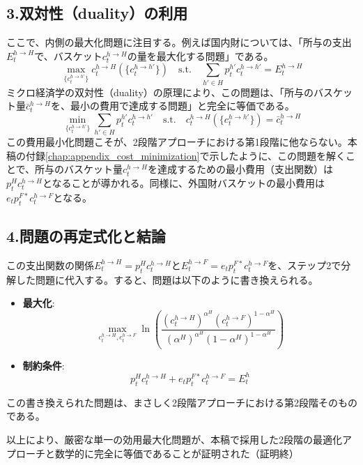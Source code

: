 \subsection*{3.双対性（duality）の利用}
\label{sec:appendix_equivalence_sub3}
ここで、内側の最大化問題に注目する。例えば国内財については、「所与の支出\(E_t^{h\to H}\)で、バスケット\(c_t^{h\to H}\)の量を最大化する問題」である。
\begin{equation}
\max_{\{c_t^{h\to h'}\}}c_t^{h\to H}(\{c_t^{h\to h'}\})\quad\text{s.t.}\quad\sum_{h'\in H}p_t^{h'}c_t^{h\to h'}=E_t^{h\to H}
\label{eq:appendix_equivalence_sub3_duality_max}
\end{equation}
ミクロ経済学の双対性（duality）の原理により、この問題は、「所与のバスケット量\(\bar{c}_t^{h\to H}\)を、最小の費用で達成する問題」と完全に等価である。
\begin{equation}
\min_{\{c_t^{h\to h'}\}}\sum_{h'\in H}p_t^{h'}c_t^{h\to h'}\quad\text{s.t.}\quad c_t^{h\to H}(\{c_t^{h\to h'}\})=\bar{c}_t^{h\to H}
\label{eq:appendix_equivalence_sub3_duality_min}
\end{equation}
この費用最小化問題こそが、2段階アプローチにおける第1段階に他ならない。本稿の付録\ref{chap:appendix_cost_minimization}で示したように、この問題を解くことで、所与のバスケット量\(c_t^{h\to H}\)を達成するための最小費用（支出関数）は\(p_t^Hc_t^{h\to H}\)となることが導かれる。同様に、外国財バスケットの最小費用は\(e_tp_t^{F*}c_t^{h\to F}\)となる。

\subsection*{4.問題の再定式化と結論}
\label{sec:appendix_equivalence_sub4}
この支出関数の関係\(E_t^{h\to H}=p_t^Hc_t^{h\to H}\)と\(E_t^{h\to F}=e_tp_t^{F*}c_t^{h\to F}\)を、ステップ2で分解した問題に代入する。すると、問題は以下のように書き換えられる。
\begin{itemize}
    \item\label{itm:appendix_equivalence_sub4_objective}\textbf{最大化}:
    \begin{equation}
    \max_{c_t^{h\to H},c_t^{h\to F}}\ln\left(\frac{(c_t^{h\to H})^{\alpha^H}(c_t^{h\to F})^{1-\alpha^H}}{(\alpha^H)^{\alpha^H}(1-\alpha^H)^{1-\alpha^H}}\right)
    \label{eq:appendix_equivalence_sub4_final_max}
    \end{equation}
    \item\label{itm:appendix_equivalence_sub4_constraint}\textbf{制約条件}:
    \begin{equation}
    p_t^Hc_t^{h\to H}+e_tp_t^{F*}c_t^{h\to F}=E_t^h
    \label{eq:appendix_equivalence_sub4_final_constraint}
    \end{equation}
\end{itemize}
この書き換えられた問題は、まさしく2段階アプローチにおける第2段階そのものである。

以上により、厳密な単一の効用最大化問題が、本稿で採用した2段階の最適化アプローチと数学的に完全に等価であることが証明された（証明終）